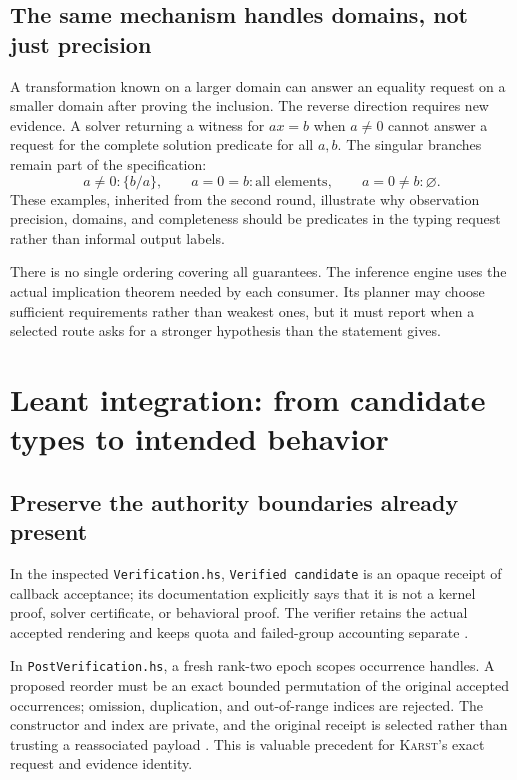\documentclass[11pt,letterpaper]{article}
\newcommand{\code}[1]{\nolinkurl{#1}}
\newcommand{\Karst}{\textsc{Karst}}
\theoremstyle{remark}
\begin{document}
\subsection{The same mechanism handles domains, not just precision}
A transformation known on a larger domain can answer an equality request on a
smaller domain after proving the inclusion. The reverse direction requires
new evidence. A solver returning a witness for $ax=b$ when $a\ne0$ cannot
answer a request for the complete solution predicate for all $a,b$.
The singular branches remain part of the specification:
\[
 a\ne0:\{b/a\},\qquad
 a=0=b:\text{all elements},\qquad
 a=0\ne b:\varnothing.
\]
These examples, inherited from the second round, illustrate why observation
precision, domains, and completeness should be predicates in the typing
request rather than informal output labels.

There is no single ordering covering all guarantees. The inference engine
uses the actual implication theorem needed by each consumer. Its planner may
choose sufficient requirements rather than weakest ones, but it must report
when a selected route asks for a stronger hypothesis than the statement gives.

\section{Leant integration: from candidate types to intended behavior}\label{sec:leant}

\subsection{Preserve the authority boundaries already present}
In the inspected \code{Verification.hs}, \code{Verified candidate} is an
opaque receipt of callback acceptance; its documentation explicitly says that
it is not a kernel proof, solver certificate, or behavioral proof. The verifier
retains the actual accepted rendering and keeps quota and failed-group
accounting separate \cite{verify}.

In \code{PostVerification.hs}, a fresh rank-two epoch scopes occurrence
handles. A proposed reorder must be an exact bounded permutation of the
original accepted occurrences; omission, duplication, and out-of-range indices
are rejected. The constructor and index are private, and the original receipt
is selected rather than trusting a reassociated payload \cite{postverify}.
This is valuable precedent for \Karst's exact request and evidence identity.
\end{document}

